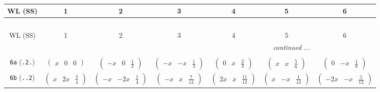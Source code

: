 \documentclass[fleqn,9pt,landscape]{jsarticle}
\begin{document}
\begin{center}
\renewcommand{\arraystretch}{1.2}
\begin{longtable}{ccccccc}
 \hline \hline
WL (SS) & 1 & 2 & 3 & 4 & 5 & 6 \\ \hline \endfirsthead

\multicolumn{6}{l}{\tablename\ \thetable{}} \\
 \hline \hline
WL (SS) & 1 & 2 & 3 & 4 & 5 & 6 \\ \hline \endhead

 \hline \hline
\multicolumn{6}{r}{\footnotesize\it continued ...} \\ \endfoot

 \hline \hline
\multicolumn{6}{r}{} \\ \endlastfoot

{\tt 6a} ({\tt .2.}) & $ \begin{pmatrix} x & 0 & 0 \end{pmatrix} $ & $ \begin{pmatrix} - x & 0 & \frac{1}{2} \end{pmatrix} $ & $ \begin{pmatrix} - x & - x & \frac{1}{3} \end{pmatrix} $ & $ \begin{pmatrix} 0 & x & \frac{2}{3} \end{pmatrix} $ & $ \begin{pmatrix} x & x & \frac{5}{6} \end{pmatrix} $ & $ \begin{pmatrix} 0 & - x & \frac{1}{6} \end{pmatrix} $ \\ \hline
{\tt 6b} ({\tt ..2}) & $ \begin{pmatrix} x & 2 x & \frac{3}{4} \end{pmatrix} $ & $ \begin{pmatrix} - x & - 2 x & \frac{1}{4} \end{pmatrix} $ & $ \begin{pmatrix} - x & x & \frac{7}{12} \end{pmatrix} $ & $ \begin{pmatrix} 2 x & x & \frac{11}{12} \end{pmatrix} $ & $ \begin{pmatrix} x & - x & \frac{1}{12} \end{pmatrix} $ & $ \begin{pmatrix} - 2 x & - x & \frac{5}{12} \end{pmatrix} $ \\ \hline

\end{longtable}
\end{center}
\end{document}
